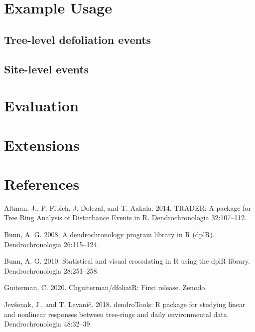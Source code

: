 \documentclass[review]{elsarticle} %
\begin{document}
\hypertarget{example-usage}{%
\section{Example Usage}\label{example-usage}}

\hypertarget{tree-level-defoliation-events}{%
\subsection{Tree-level defoliation
events}\label{tree-level-defoliation-events}}

\hypertarget{site-level-events}{%
\subsection{Site-level events}\label{site-level-events}}

\hypertarget{evaluation}{%
\section{Evaluation}\label{evaluation}}

\hypertarget{extensions}{%
\section{Extensions}\label{extensions}}

\hypertarget{references}{%
\section*{References}\label{references}}

\hypertarget{refs}{}
\leavevmode\hypertarget{ref-Altman2014}{}%
Altman, J., P. Fibich, J. Dolezal, and T. Aakala. 2014. TRADER: A
package for Tree Ring Analysis of Disturbance Events in R.
Dendrochronologia 32:107--112.

\leavevmode\hypertarget{ref-Bunn2008}{}%
Bunn, A. G. 2008. A dendrochronology program library in R (dplR).
Dendrochronologia 26:115--124.

\leavevmode\hypertarget{ref-Bunn2010}{}%
Bunn, A. G. 2010. Statistical and visual crossdating in R using the dplR
library. Dendrochronologia 28:251--258.

\leavevmode\hypertarget{ref-chris_guiterman_2020_3626136}{}%
Guiterman, C. 2020. Chguiterman/dfoliatR: First release. Zenodo.

\leavevmode\hypertarget{ref-Jevsenak2018}{}%
Jevšenak, J., and T. Levanič. 2018. dendroTools: R package for studying
linear and nonlinear responses between tree-rings and daily
environmental data. Dendrochronologia 48:32--39.
\end{document}
